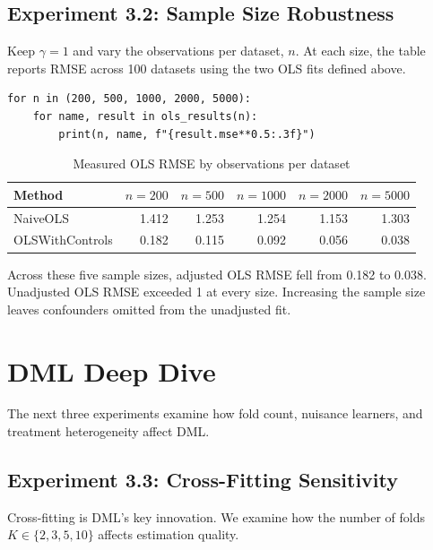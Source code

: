 \subsection{Experiment 3.2: Sample Size Robustness}

Keep $\gamma=1$ and vary the observations per dataset, $n$. At each size, the table reports RMSE across 100 datasets using the two OLS fits defined above.

\begin{verbatim}
for n in (200, 500, 1000, 2000, 5000):
    for name, result in ols_results(n):
        print(n, name, f"{result.mse**0.5:.3f}")
\end{verbatim}

\begin{table}[htbp]
\centering
\caption{Measured OLS RMSE by observations per dataset}
\label{tab:exp32_rmse}
\setlength{\tabcolsep}{2.5pt}
\begin{tabular}{lrrrrr}
\hline
Method & $n=200$ & $n=500$ & $n=1000$ & $n=2000$ & $n=5000$ \\
\hline
NaiveOLS & 1.412 & 1.253 & 1.254 & 1.153 & 1.303 \\
OLSWithControls & 0.182 & 0.115 & 0.092 & 0.056 & 0.038 \\
\hline
\end{tabular}
\end{table}

Across these five sample sizes, adjusted OLS RMSE fell from 0.182 to 0.038. Unadjusted OLS RMSE exceeded 1 at every size. Increasing the sample size leaves confounders omitted from the unadjusted fit.


\section{DML Deep Dive}

The next three experiments examine how fold count, nuisance learners, and treatment heterogeneity affect DML.

\subsection{Experiment 3.3: Cross-Fitting Sensitivity}

Cross-fitting is DML's key innovation. We examine how the number of folds $K \in \{2, 3, 5, 10\}$ affects estimation quality.

